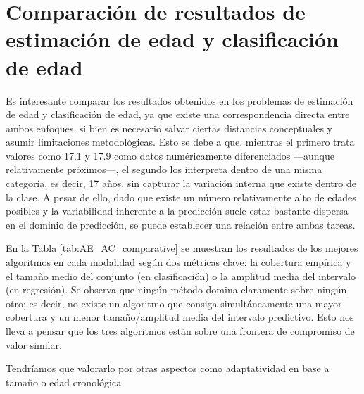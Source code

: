 \chapter{Comparación de resultados de estimación de edad y clasificación de edad}

Es interesante comparar los resultados obtenidos en los problemas de estimación de edad y clasificación de edad, ya que existe una correspondencia directa entre ambos enfoques, si bien es necesario salvar ciertas distancias conceptuales y asumir limitaciones metodológicas. Esto se debe a que, mientras el primero trata valores como 17.1 y 17.9 como datos numéricamente diferenciados ---aunque relativamente próximos---, el segundo los interpreta dentro de una misma categoría, es decir, 17 años, sin capturar la variación interna que existe dentro de la clase. A pesar de ello, dado que existe un número relativamente alto de edades posibles y la variabilidad inherente a la predicción suele estar bastante dispersa en el dominio de predicción, se puede establecer una relación entre ambas tareas.

En la Tabla \ref{tab:AE_AC_comparative} se muestran los resultados de los mejores algoritmos en cada modalidad según dos métricas clave: la cobertura empírica y el tamaño medio del conjunto (en clasificación) o la amplitud media del intervalo (en regresión). Se observa que ningún método domina claramente sobre ningún otro; es decir, no existe un algoritmo que consiga simultáneamente una mayor cobertura y un menor tamaño/amplitud media del intervalo predictivo. Esto nos lleva a pensar que los tres algoritmos están sobre una frontera de compromiso de valor similar.

Tendríamos que valorarlo por otras aspectos como adaptatividad en base a tamaño o edad cronológica

